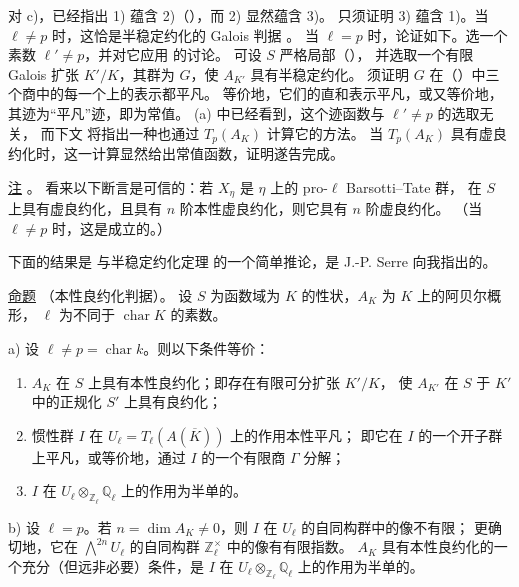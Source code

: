 对 c)，已经指出 1) 蕴含 2)（），而 2) 显然蕴含 3)。
只须证明 3) 蕴含 1)。当 $\ell\neq p$ 时，这恰是半稳定约化的 Galois 判据 。
当 $\ell=p$ 时，论证如下。选一个素数 $\ell'\neq p$，并对它应用  的讨论。
可设 $S$ 严格局部（），
并选取一个有限 Galois 扩张 $K'/K$，其群为 $G$，使 $A_{K'}$ 具有半稳定约化。
须证明 $G$ 在（）中三个商中的每一个上的表示都平凡。
等价地，它们的直和表示平凡，或又等价地，其迹为“平凡”迹，即为常值。
(a) 中已经看到，这个迹函数与 $\ell'\neq p$ 的选取无关，
而下文  将指出一种也通过 $T_p(A_K)$ 计算它的方法。
当 $T_p(A_K)$ 具有虚良约化时，这一计算显然给出常值函数，证明遂告完成。

\medskip
\noindent
\underline{注} 。
看来以下断言是可信的：若 $X_\eta$ 是 $\eta$ 上的 pro-$\ell$ Barsotti--Tate 群，
在 $S$ 上具有虚良约化，且具有 $n$ 阶本性虚良约化，则它具有 $n$ 阶虚良约化。
（当 $\ell\neq p$ 时，这是成立的。）

下面的结果是  与半稳定约化定理
 的一个简单推论，是 J.-P. Serre 向我指出的。

\medskip
\noindent
\underline{命题} （本性良约化判据）。
设 $S$ 为函数域为 $K$ 的性状，$A_K$ 为 $K$ 上的阿贝尔概形，
$\ell$ 为不同于 $\operatorname{char}K$ 的素数。

\smallskip
\noindent
a) 设 $\ell\neq p=\operatorname{char}k$。则以下条件等价：
\begin{enumerate}
\item[(i)] $A_K$ 在 $S$ 上具有本性良约化；即存在有限可分扩张 $K'/K$，
  使 $A_{K'}$ 在 $S$ 于 $K'$ 中的正规化 $S'$ 上具有良约化；
\item[(ii)] 惯性群 $I$ 在 $U_\ell=T_\ell(A(\overline K))$ 上的作用本性平凡；
  即它在 $I$ 的一个开子群上平凡，或等价地，通过 $I$ 的一个有限商 $\Gamma$ 分解；
\item[(iii)] $I$ 在 $U_\ell\otimes_{\mathbb Z_\ell}\mathbb Q_\ell$ 上的作用为半单的。
\end{enumerate}

\noindent
b) 设 $\ell=p$。若 $n=\dim A_K\neq0$，则 $I$ 在 $U_\ell$ 的自同构群中的像不有限；
更确切地，它在 $\bigwedge^{2n}U_\ell$ 的自同构群 $\mathbb Z_\ell^\times$ 中的像有有限指数。
$A_K$ 具有本性良约化的一个充分（但远非必要）条件，是
$I$ 在 $U_\ell\otimes_{\mathbb Z_\ell}\mathbb Q_\ell$ 上的作用为半单的。

